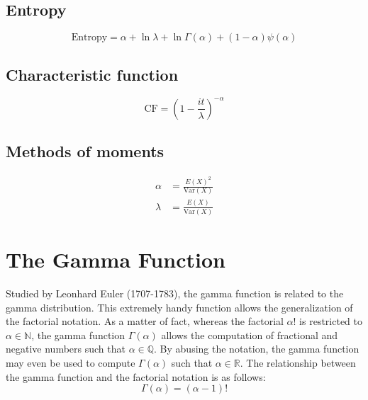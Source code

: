 \documentclass[12pt]{article}
\begin{document}
\subsection{Entropy}
\begin{equation*}\label{eq:gamma-entropy-2}
	\text{Entropy} = \alpha + \ln{\lambda} + \ln{\Gamma(\alpha)} + (1-\alpha)\psi(\alpha)
\end{equation*}

\subsection{Characteristic function}
\begin{equation*}\label{eq:gamma-cf-2}
	\text{CF} = \left(1-\frac{it}{\lambda}\right)^{-\alpha}
\end{equation*}

\subsection{Methods of moments}
\begin{equation*}\label{eq:gamma-mom-2}
	\begin{split}
		\alpha	&=	\frac{E(X)^2}{\text{Var}(X)}\\
		\lambda	&=	\frac{E(X)}{\text{Var}(X)}
	\end{split}
\end{equation*}


\pagebreak
\section{The Gamma Function}
\vspace*{-6pt}
Studied by Leonhard Euler (1707-1783), the gamma function is related to the gamma distribution. This extremely handy
function allows the generalization of the factorial notation. As a matter of fact, whereas the factorial $\alpha!$ is
restricted to $\alpha\in\mathbb{N}$, the gamma function $\Gamma(\alpha)$ allows the computation of fractional and
negative numbers such that $\alpha\in\mathbb{Q}$. By abusing the notation, the gamma function may even be used to
compute $\Gamma(\alpha)$ such that $\alpha\in\mathbb{R}$. The relationship between the gamma function and the factorial
notation is as follows:
\vspace*{-18pt}
\begin{equation}\label{eq:gammafunction:factorial}
	\Gamma(\alpha)=(\alpha-1)!
\end{equation}
\vspace*{-60pt}
\end{document}
